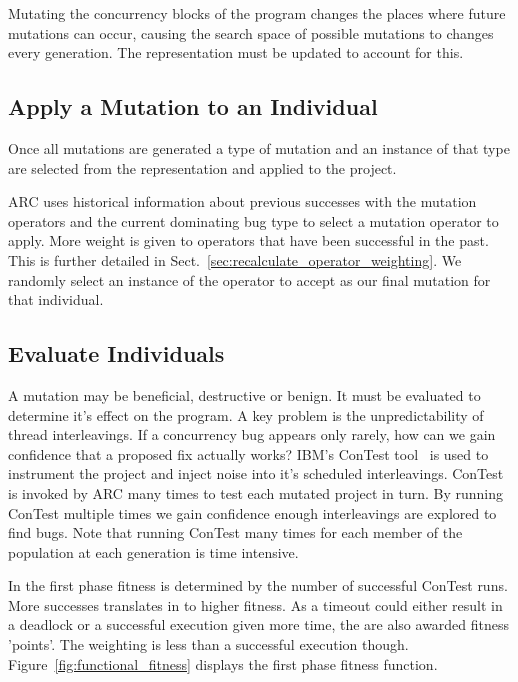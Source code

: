 \documentclass{llncs}
\begin{document}
Mutating the concurrency blocks of the program changes the places where future
mutations can occur, causing the search space of possible mutations to changes
every generation. The representation must be updated to account for this.

\subsection{Apply a Mutation to an Individual}
\label{sec:mutate_individuals}

Once all mutations are generated a type of mutation and an instance of that
type are selected from the representation and applied to the project.

ARC uses historical information about previous successes with the mutation
operators and the current dominating bug type to select a mutation operator to
apply. More weight is given to operators that have been successful in the past.
This is further detailed in Sect.~\ref{sec:recalculate_operator_weighting}. We
randomly select an instance of the operator to accept as our final mutation for
that individual.

\subsection{Evaluate Individuals}
\label{sec:evalute_individuals}

A mutation may be beneficial, destructive or benign. It must be evaluated to
determine it's effect on the program. A key problem is the unpredictability of
thread interleavings. If a concurrency bug appears only rarely, how can we gain
confidence that a proposed fix actually works? IBM's ConTest tool~\cite{EFN+02}
is used to instrument the project and inject noise into it's scheduled
interleavings. ConTest is invoked by ARC many times to test each mutated
project in turn. By running ConTest multiple times we gain confidence enough
interleavings are explored to find bugs. Note that running ConTest many times
for each member of the population at each generation is time intensive.

In the first phase fitness is determined by the number of successful ConTest
runs. More successes translates in to higher fitness. As a timeout could either
result in a deadlock or a successful execution given more time, the are also
awarded fitness 'points'. The weighting is less than a successful execution
though. Figure~\ref{fig:functional_fitness} displays the first phase fitness
function.
\end{document}
